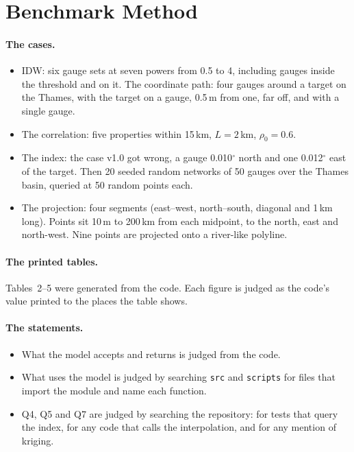 \documentclass[11pt,a4paper]{article}
\begin{document}
\section{Benchmark Method}

\paragraph{The cases.}
\begin{itemize}[leftmargin=*,nosep]
\item IDW: six gauge sets at seven powers from 0.5 to 4, including gauges inside the
  threshold and on it. The coordinate path: four gauges around a target on the Thames,
  with the target on a gauge, 0.5\,m from one, far off, and with a single gauge.
\item The correlation: five properties within 15\,km, $L=2$\,km, $\rho_0=0.6$.
\item The index: the case v1.0 got wrong, a gauge 0.010$^\circ$ north and one 0.012$^\circ$
  east of the target. Then 20 seeded random networks of 50 gauges over the Thames basin,
  queried at 50 random points each.
\item The projection: four segments (east--west, north--south, diagonal and 1\,km long).
  Points sit 10\,m to 200\,km from each midpoint, to the north, east and north-west.
  Nine points are projected onto a river-like polyline.
\end{itemize}

\paragraph{The printed tables.} Tables~2--5 were generated from the code. Each figure is
judged as the code's value printed to the places the table shows.

\paragraph{The statements.}
\begin{itemize}[leftmargin=*,nosep]
\item What the model accepts and returns is judged from the code.
\item What uses the model is judged by searching \texttt{src} and \texttt{scripts} for
  files that import the module and name each function.
\item Q4, Q5 and Q7 are judged by searching the repository: for tests that query the
  index, for any code that calls the interpolation, and for any mention of kriging.
\end{itemize}
\end{document}
